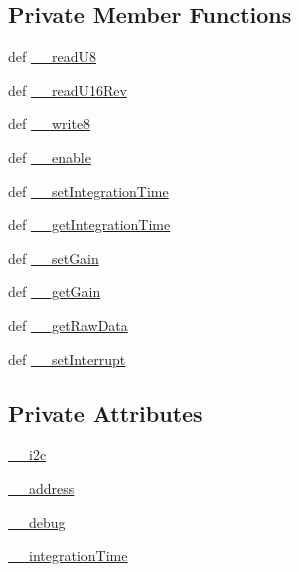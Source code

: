 \subsection*{Private Member Functions}
\begin{DoxyCompactItemize}
\item 
def \hyperlink{classlibsensorPy_1_1concretesensor_1_1tcs34725_1_1TCS34725_a8d9bc04a969e7e5eb4fe4f5c3a9a0005}{\+\_\+\+\_\+read\+U8}
\item 
def \hyperlink{classlibsensorPy_1_1concretesensor_1_1tcs34725_1_1TCS34725_a111c7360a2715fc52d540818583ebaba}{\+\_\+\+\_\+read\+U16\+Rev}
\item 
def \hyperlink{classlibsensorPy_1_1concretesensor_1_1tcs34725_1_1TCS34725_a0fab5b65aecbdca59058158b5bf639bc}{\+\_\+\+\_\+write8}
\item 
def \hyperlink{classlibsensorPy_1_1concretesensor_1_1tcs34725_1_1TCS34725_ac2c3a125a98f220a80e51b5e3a8593e7}{\+\_\+\+\_\+enable}
\item 
def \hyperlink{classlibsensorPy_1_1concretesensor_1_1tcs34725_1_1TCS34725_ae5ea49da721698bfe8b23ac57ebcf057}{\+\_\+\+\_\+set\+Integration\+Time}
\item 
def \hyperlink{classlibsensorPy_1_1concretesensor_1_1tcs34725_1_1TCS34725_a9e6aeecf98cf298f5f91e54ad3178983}{\+\_\+\+\_\+get\+Integration\+Time}
\item 
def \hyperlink{classlibsensorPy_1_1concretesensor_1_1tcs34725_1_1TCS34725_a06ea8b914e02b7027be29ecb25140e47}{\+\_\+\+\_\+set\+Gain}
\item 
def \hyperlink{classlibsensorPy_1_1concretesensor_1_1tcs34725_1_1TCS34725_ab8a26f9df341bb582525f84a667817cb}{\+\_\+\+\_\+get\+Gain}
\item 
def \hyperlink{classlibsensorPy_1_1concretesensor_1_1tcs34725_1_1TCS34725_a034ab33bb0f4071f682bb24d74afe6dc}{\+\_\+\+\_\+get\+Raw\+Data}
\item 
def \hyperlink{classlibsensorPy_1_1concretesensor_1_1tcs34725_1_1TCS34725_a620a96215177fffdd01c9b6dfdd92551}{\+\_\+\+\_\+set\+Interrupt}
\end{DoxyCompactItemize}
\subsection*{Private Attributes}
\begin{DoxyCompactItemize}
\item 
\hyperlink{classlibsensorPy_1_1concretesensor_1_1tcs34725_1_1TCS34725_a1df423160415799dbfe7f044d0e37c4e}{\+\_\+\+\_\+i2c}
\item 
\hyperlink{classlibsensorPy_1_1concretesensor_1_1tcs34725_1_1TCS34725_aa8ed9f22e46d70cac23b8d14b8001059}{\+\_\+\+\_\+address}
\item 
\hyperlink{classlibsensorPy_1_1concretesensor_1_1tcs34725_1_1TCS34725_ac257d4543d4f5c67e33e35ac909a5514}{\+\_\+\+\_\+debug}
\item 
\hyperlink{classlibsensorPy_1_1concretesensor_1_1tcs34725_1_1TCS34725_af87fb8fde44b266bb924fc75a65f5199}{\+\_\+\+\_\+integration\+Time}
\end{DoxyCompactItemize}
